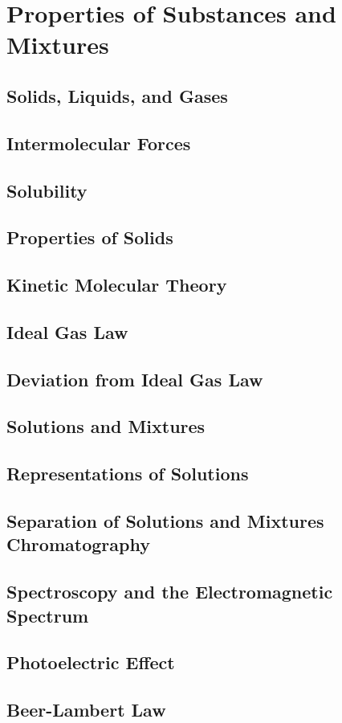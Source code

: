 \documentclass[../chem.tex]{subfiles}
\begin{document}
\chapter{Properties of Substances and Mixtures}
\section{Solids, Liquids, and Gases}
\section{Intermolecular Forces}
\section{Solubility}
\section{Properties of Solids}
\section{Kinetic Molecular Theory}
\section{Ideal Gas Law}
\section{Deviation from Ideal Gas Law}
\section{Solutions and Mixtures}
\section{Representations of Solutions}
\section{Separation of Solutions and Mixtures Chromatography}
\section{Spectroscopy and the Electromagnetic Spectrum}
\section{Photoelectric Effect}
\section{Beer-Lambert Law}
\end{document}
